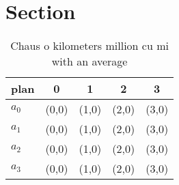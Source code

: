\documentclass[a4paper]{article}
\begin{document}
\section{Section}

\begin{table}
\begin{adjustbox}{width=0.5\columnwidth}
\begin{tabular}{|l|l|l|l|l|}
\hline
\textbf{plan} & \multicolumn{1}{c|}{\textbf{0}} & \multicolumn{1}{c|}{\textbf{1}} & \multicolumn{1}{c|}{\textbf{2}} & \multicolumn{1}{c|}{\textbf{3}} \\ \hline
\textbf{$a_0$}  & (0,0) & (1,0) & (2,0) & (3,0) \\ \hline
\textbf{$a_1$}  & (0,0) & (1,0) & (2,0) & (3,0) \\ \hline
\textbf{$a_2$}  & (0,0) & (1,0) & (2,0) & (3,0) \\ \hline
\textbf{$a_3$}  & (0,0) & (1,0) & (2,0) & (3,0) \\ \hline
\end{tabular}
\end{adjustbox}
\caption{Chaus o kilometers million cu mi with an average 
}
\end{table}
\end{document}

